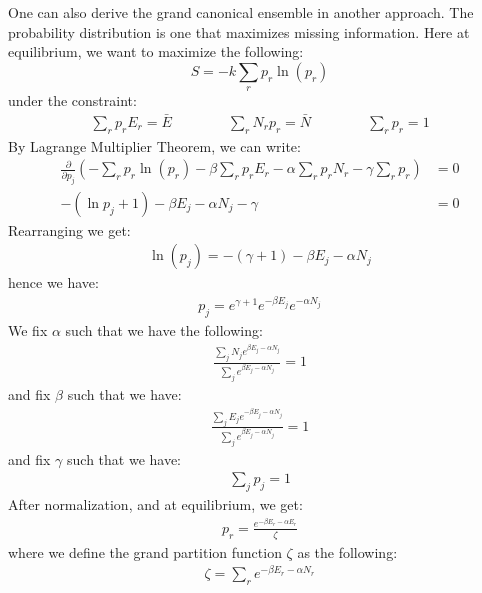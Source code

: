 \documentclass[11pt,oneside]{book}
\theoremstyle{break}
\theoremstyle{break}
\newcommand{\pd}{\partial}
\begin{document}
One can also derive the grand canonical ensemble in another approach. The probability distribution is one that maximizes missing information. Here at equilibrium, we want to maximize the following:
$$S = -k \sum_r p_r \ln(p_r)$$ 
under the constraint:
\begin{align*}
\sum_r p_r E_r = \bar{E} \qquad \qquad \sum_r N_r p_r = \bar{N} \qquad\qquad \sum_r p_r = 1
\end{align*} 
By Lagrange Multiplier Theorem, we can write:
\begin{align*}
\frac{\pd}{\pd p_j} \left( -\sum_r p_r \ln(p_r) - \beta \sum_r p_r E_r - \alpha \sum_r p_r N_r - \gamma \sum_r p_r \right) &= 0\\
 -(\ln p_j +1) - \beta E_j - \alpha N_j - \gamma &= 0
\end{align*}
Rearranging we get:
\begin{align*}
\ln(p_j) = -(\gamma+1) -\beta E_j - \alpha N_j
\end{align*} 
hence we have:
\begin{align*}
p_j = e^{\gamma+1} e^{-\beta E_j} e^{-\alpha N_j}
\end{align*}
We fix $\alpha$ such that we have the following:
\begin{align*}
\frac{\sum_j N_j e^{\beta E_j - \alpha N_j}}{\sum_j e^{\beta E_j - \alpha N_j}} = 1
\end{align*} 
and fix $\beta$ such that we have:
\begin{align*}
\frac{\sum_j E_j e^{-\beta E_j - \alpha N_j}}{\sum_j e^{\beta E_j - \alpha N_j}} = 1
\end{align*}
and fix $\gamma$ such that we have:
\begin{align*}
\sum_j p_j = 1
\end{align*}
\newpage
After normalization, and at equilibrium, we get:
\begin{align*}
p_r = \frac{e^{-\beta E_r - \alpha E_r}}{\zeta}
\end{align*}
where we define the grand partition function $\zeta$ as the following:
\begin{align*}
\zeta = \sum_r e^{-\beta E_r - \alpha N_r}
\end{align*}
\end{document}
